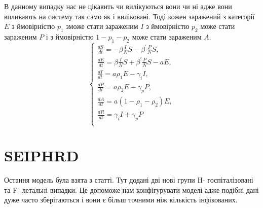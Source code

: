 В данному випадку нас не цікавить чи вилікуються вони
чи ні адже вони впливають на систему так само як і виліковані. Тоді кожен 
заражений з категорії $E$ з ймовірністю $p_1$ зможе стати зараженим $I$ 
з ймовірністю $p_2$ може стати зараженим $P$ і з ймовірністю $1 - p_1 - p_2$
може стати зараженим $A$. 
\begin{equation*}
    \left\{\begin{array}{l}
    \frac{d S}{d t}=-\beta \frac{I}{N} S-\beta^{\prime} \frac{P}{N} S, \\
    \frac{d E}{d t}=\beta \frac{I}{N} S +\beta^{\prime} \frac{P}{N} S- aE, \\
    \frac{d I}{d t}= a \rho_1 E-\gamma_i I, \\
    \frac{d P}{d t}= a \rho_2 E-\gamma_p P, \\
    \frac{d A}{d t}= a\left(1-\rho_1-\rho_2\right) E, \\
    \frac{d R}{d t}=\gamma_i I + \gamma_p P\\
    \end{array}\right.
\end{equation*}

\section{SEIPHRD}


Остання модель була взята з статті. Тут додані дві нові групи 
H- госпіталізовані та F- летальні випадки. Це допоможе нам конфігурувати 
моделі адже подібні дані дуже часто зберігаються і вони є більш точними 
ніж кількість інфікованих. 

